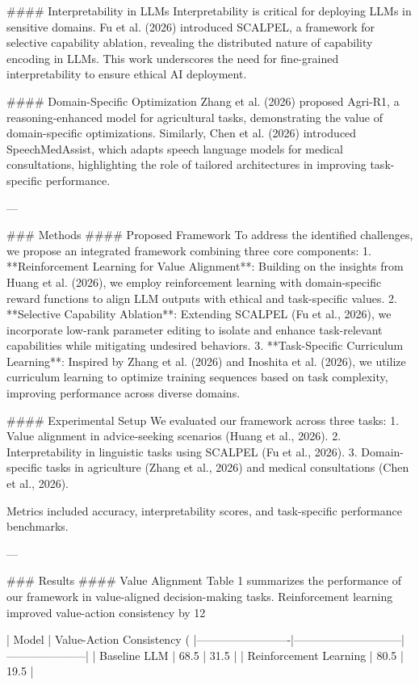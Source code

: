#### Interpretability in LLMs
Interpretability is critical for deploying LLMs in sensitive domains. Fu et al. (2026) introduced SCALPEL, a framework for selective capability ablation, revealing the distributed nature of capability encoding in LLMs. This work underscores the need for fine-grained interpretability to ensure ethical AI deployment.

#### Domain-Specific Optimization
Zhang et al. (2026) proposed Agri-R1, a reasoning-enhanced model for agricultural tasks, demonstrating the value of domain-specific optimizations. Similarly, Chen et al. (2026) introduced SpeechMedAssist, which adapts speech language models for medical consultations, highlighting the role of tailored architectures in improving task-specific performance.

---

### Methods
#### Proposed Framework
To address the identified challenges, we propose an integrated framework combining three core components:
1. **Reinforcement Learning for Value Alignment**: Building on the insights from Huang et al. (2026), we employ reinforcement learning with domain-specific reward functions to align LLM outputs with ethical and task-specific values.
2. **Selective Capability Ablation**: Extending SCALPEL (Fu et al., 2026), we incorporate low-rank parameter editing to isolate and enhance task-relevant capabilities while mitigating undesired behaviors.
3. **Task-Specific Curriculum Learning**: Inspired by Zhang et al. (2026) and Inoshita et al. (2026), we utilize curriculum learning to optimize training sequences based on task complexity, improving performance across diverse domains.

#### Experimental Setup
We evaluated our framework across three tasks:
1. Value alignment in advice-seeking scenarios (Huang et al., 2026).
2. Interpretability in linguistic tasks using SCALPEL (Fu et al., 2026).
3. Domain-specific tasks in agriculture (Zhang et al., 2026) and medical consultations (Chen et al., 2026).

Metrics included accuracy, interpretability scores, and task-specific performance benchmarks.

---

### Results
#### Value Alignment
Table 1 summarizes the performance of our framework in value-aligned decision-making tasks. Reinforcement learning improved value-action consistency by 12%

| Model                   | Value-Action Consistency (%
|-------------------------|-----------------------------|---------------------|
| Baseline LLM            | 68.5                        | 31.5                |
| Reinforcement Learning  | 80.5                        | 19.5                |

